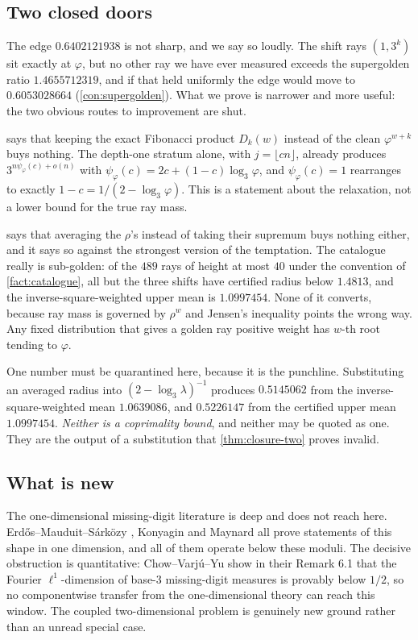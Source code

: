 \documentclass[11pt]{amsart}
\theoremstyle{definition}
\theoremstyle{remark}
\begin{document}
\subsection*{Two closed doors}

The edge $0.6402121938$ is not sharp, and we say so loudly. The shift rays $(1,3^k)$ sit exactly at $\varphi$, but no other ray we have ever measured exceeds the supergolden ratio $1.4655712319$, and if that held uniformly the edge would move to $0.6053028664$ (\cref{con:supergolden}). What we prove is narrower and more useful: the two obvious routes to improvement are shut.

 says that keeping the exact Fibonacci product $D_k(w)$ instead of the clean $\varphi^{w+k}$ buys nothing. The depth-one stratum alone, with $j = \lfloor cn \rfloor$, already produces $3^{n\psi_\varphi(c) + o(n)}$ with $\psi_\varphi(c) = 2c + (1-c)\log_3\varphi$, and $\psi_\varphi(c) = 1$ rearranges to exactly $1 - c = 1/(2 - \log_3\varphi)$. This is a statement about the relaxation, not a lower bound for the true ray mass.

 says that averaging the $\rho$'s instead of taking their supremum buys nothing either, and it says so against the strongest version of the temptation. The catalogue really is sub-golden: of the $489$ rays of height at most $40$ under the convention of \cref{fact:catalogue}, all but the three shifts have certified radius below $1.4813$, and the inverse-square-weighted upper mean is $1.0997454$. None of it converts, because ray mass is governed by $\rho^w$ and Jensen's inequality points the wrong way. Any fixed distribution that gives a golden ray positive weight has $w$-th root tending to $\varphi$.

One number must be quarantined here, because it is the punchline. Substituting an averaged radius into $(2 - \log_3\lambda)^{-1}$ produces $0.5145062$ from the inverse-square-weighted mean $1.0639086$, and $0.5226147$ from the certified upper mean $1.0997454$. \emph{Neither is a coprimality bound}, and neither may be quoted as one. They are the output of a substitution that \cref{thm:closure-two} proves invalid.

\subsection*{What is new}

The one-dimensional missing-digit literature is deep and does not reach here. Erd\H{o}s--Mauduit--S\'ark\"ozy \cite{ems}, Konyagin \cite{konyagin} and Maynard \cite{maynard} all prove statements of this shape in one dimension, and all of them operate below these moduli. The decisive obstruction is quantitative: Chow--Varj\'u--Yu \cite{cvy} show in their Remark 6.1 that the Fourier $\ell^1$-dimension of base-$3$ missing-digit measures is provably below $1/2$, so no componentwise transfer from the one-dimensional theory can reach this window. The coupled two-dimensional problem is genuinely new ground rather than an unread special case.
\end{document}
